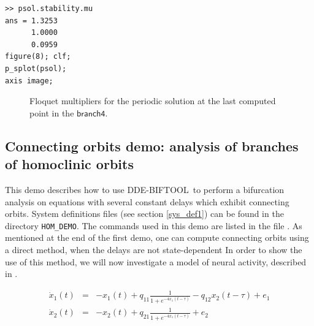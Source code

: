 \documentclass[10pt]{article}
\gdef \DDEBIFCODE{{\scshape DDE-BIFTOOL}}
\gdef \file#1{{\bfseries{\ttfamily{#1}}}}
\gdef \parm#1{{\mathsf{#1}}}
\begin{document}
{{\begin{verbatim}
>> psol.stability.mu
ans = 1.3253
      1.0000
      0.0959
figure(8); clf;
p_splot(psol);
axis image;
\end{verbatim}}
\begin{figure}[h]
\begin{center}
\end{center}
\caption{\small\label{sd_dde_mu}Floquet multipliers for the periodic 
solution at the last computed point in the $\parm{branch4}$.} 
\end{figure}


\subsection{Connecting orbits demo: analysis of branches of homoclinic orbits}\label{demo3}
This demo describes how to use \DDEBIFCODE\ to perform a bifurcation analysis on equations
with several constant delays which exhibit connecting orbits.  
System definitions files  (see section \ref{sys_def1}) can be
found in the directory \verb$HOM_DEMO$.  The commands used in this demo are listed in the file 
\file{hom\_demo.m}.
As mentioned at the end of the first demo, one can compute connecting
orbits using a direct method, when the delays are not state-dependent 
In order to show the use of this method,
we will now investigate a model of neural activity, described in \cite{zapp}.

\parbox{10cm}{
\begin{eqnarray*}
\dot{x}_{1}(t)&=&-x_{1}(t)+q_{11}\frac{1}{1+e^{-4x_{1}(t-\tau)}}-q_{12}x_2(t-\tau) +e_1\\
\dot{x}_{2}(t)&=&-x_2(t)+q_{21}\frac{1}{1+e^{-4x_{1}(t-\tau)}}+e_2
\end{eqnarray*}
}
\hfill \parbox{1cm}{\begin{eqnarray}\label{z}\end{eqnarray}}

}
\end{document}

